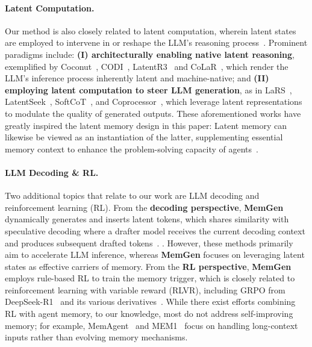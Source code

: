 \documentclass[]{fairmeta}
\newcommand{\ourmethod}{{\fontfamily{lmtt}\selectfont \textbf{MemGen}}\xspace}
\begin{document}
\paragraph{Latent Computation.} Our method is also closely related to latent computation, wherein latent states are employed to intervene in or reshape the LLM's reasoning process~\citep{zhu2025surveylatentreasoning}. Prominent paradigms include: \textbf{(I) architecturally enabling native latent reasoning}, exemplified by Coconut~\citep{hao2024coconuttraininglargelanguagemodels}, CODI~\citep{shen2025codicompressingchainofthoughtcontinuous}, LatentR3~\citep{zhang2025reinforcedlatentreasoningllmbased} and CoLaR~\citep{tan2025thinksilentlythinkfast}, which render the LLM's inference process inherently latent and machine-native; and \textbf{(II) employing latent computation to steer LLM generation}, as in LaRS~\citep{xu2023latentskill}, LatentSeek~\citep{li2025seekdarkreasoningtesttime}, SoftCoT~\citep{xu2025softcottesttimescalingsoft,xu2025softcotsoftchainofthoughtefficient}, and Coprocessor~\citep{liu2024deliberation}, which leverage latent representations to modulate the quality of generated outputs. These aforementioned works have greatly inspired the latent memory design in this paper: Latent memory can likewise be viewed as an instantiation of the latter, supplementing essential memory context to enhance the problem-solving capacity of agents~\citep{wang2024memoryllm,wang2025mextendingmemoryllmscalable}.


\vspace{-0.7em}
\paragraph{LLM Decoding \& RL.} Two additional topics that relate to our work are LLM decoding and reinforcement learning (RL). From the \textbf{decoding perspective}, \ourmethod dynamically generates and inserts latent tokens, which shares similarity with speculative decoding where a drafter model receives the current decoding context and produces subsequent drafted tokens~\citep{cai2024medusasimplellminference,fu2024breaksequentialdependencyllm,li2025eaglespeculativesamplingrequires,goel2025vocabtrimvocabularypruningefficient}.
. However, these methods primarily aim to accelerate LLM inference, whereas \ourmethod focuses on leveraging latent states as effective carriers of memory.
From the \textbf{RL perspective}, \ourmethod employs rule-based RL to train the memory trigger, which is closely related to reinforcement learning with variable reward (RLVR), including GRPO from DeepSeek-R1~\citep{deepseekai2025deepseekr1incentivizingreasoningcapability} and its various derivatives~\citep{qian2025toolrlrewardtoollearning,wu2025vtoolr1vlmslearnthink,wei2025autotirautonomoustoolsintegrated,fu2025agentrefineenhancingagentgeneralization}. 
While there exist efforts combining RL with agent memory, to our knowledge, most do not address self-improving memory; for example, MemAgent~\citep{yu2025memagentreshapinglongcontextllm} and MEM1~\citep{zhou2025mem1learningsynergizememory} focus on handling long-context inputs rather than evolving memory mechanisms.     
\end{document}
